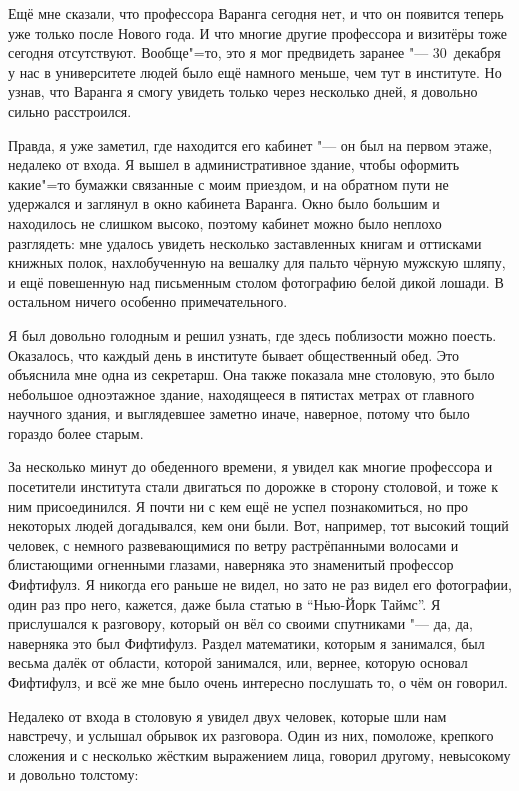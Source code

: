 Ещё мне сказали, что профессора Варанга сегодня нет, и что он появится теперь
уже только после Нового года.
И что многие другие профессора и визитёры тоже сегодня отсутствуют.
Вообще"=то, это я мог предвидеть заранее "--- 30~декабря у нас в университете
людей было ещё намного меньше, чем тут в институте.
Но узнав, что Варанга я смогу увидеть только через несколько дней, я довольно
сильно расстроился.

Правда, я уже заметил, где находится его кабинет "--- он был на первом этаже,
недалеко от входа.
Я вышел в административное здание, чтобы оформить какие"=то бумажки связанные с
моим приездом, и на обратном пути не удержался и заглянул в окно кабинета
Варанга.
Окно было большим и находилось не слишком высоко, поэтому кабинет можно было
неплохо разглядеть:
мне удалось увидеть несколько заставленных книгам и оттисками книжных полок,
нахлобученную на вешалку для пальто чёрную мужскую шляпу, и ещё повешенную над
письменным столом фотографию белой дикой лошади.
В остальном ничего особенно примечательного.

Я был довольно голодным и решил узнать, где здесь поблизости можно поесть.
Оказалось, что каждый день в институте бывает общественный обед.
Это объяснила мне одна из секретарш.
Она также показала мне столовую, это было небольшое одноэтажное здание,
находящееся в пятистах метрах от главного научного здания, и выглядевшее
заметно иначе, наверное, потому что было гораздо более старым.

За несколько минут до обеденного времени, я увидел как многие профессора и
посетители института стали двигаться по дорожке в сторону столовой, и тоже к ним
присоединился.
Я почти ни с кем ещё не успел познакомиться, но про некоторых людей догадывался,
кем они были.
Вот, например, тот высокий тощий человек, с немного развевающимися по ветру
растрёпанными волосами и блистающими огненными глазами, наверняка это знаменитый
профессор Фифтифулз.
Я никогда его раньше не видел, но зато не раз видел его фотографии, один раз про
него, кажется, даже была статью в \enquote{Нью-Йорк Таймс}.
Я прислушался к разговору, который он вёл со своими спутниками "--- да, да,
наверняка это был Фифтифулз.
Раздел математики, которым я занимался, был весьма далёк от области, которой
занимался, или, вернее, которую основал Фифтифулз, и всё же мне было очень
интересно послушать то, о чём он говорил.

Недалеко от входа в столовую я увидел двух человек, которые шли нам навстречу,
и услышал обрывок их разговора.
Один из них, помоложе, крепкого сложения и с несколько жёстким выражением лица,
говорил другому, невысокому и довольно толстому:

